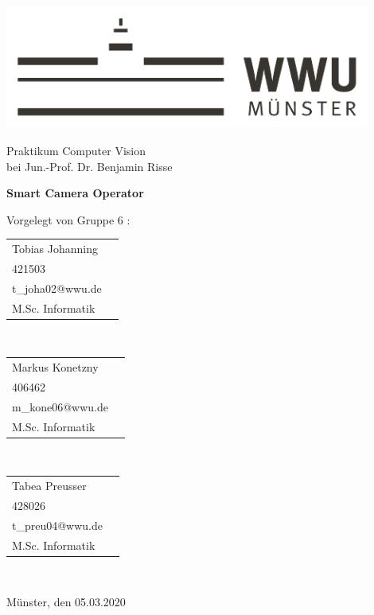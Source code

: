 
\begin{centering}
\vspace{4cm}
\includegraphics[width=12cm]{./img/wwu-logo-neu.pdf}

\vspace{2cm} 

{\large
	Praktikum Computer Vision\\[0.5cm]
	bei Jun.-Prof. Dr. Benjamin Risse\\[1cm]
}

{\LARGE
	\textbf{Smart Camera Operator}\\[2cm]
}


{\large
	Vorgelegt von Gruppe 6 :\\[0.5cm]
}



\begin{minipage}{\textwidth}
\begin{minipage}[c]{0.3\textwidth}
\centering
 \begin{tabular}{ll}
 		Tobias Johanning \\
    	{421503} \\
    	{t_joha02@wwu.de} \\
    	 M.Sc. Informatik\\
    \end{tabular}\\
\end{minipage}\hfill
\begin{minipage}[c]{0.3\textwidth}
\centering
   \begin{tabular}{ll}
 		Markus Konetzny \\
    	{406462} \\
    	{m_kone06@wwu.de} \\
    	M.Sc. Informatik\\
    \end{tabular}\\
\end{minipage}\hfill
\begin{minipage}[c]{0.3\textwidth}
\centering
   \begin{tabular}{ll}
 		Tabea Preusser \\
    	{428026} \\
    	{t_preu04@wwu.de} \\
    	M.Sc. Informatik\\
    \end{tabular}\\
\end{minipage}\hfill
\end{minipage}

\vspace{2 cm}
{\large
	Münster, den 05.03.2020\\[1cm]
}
\end{centering}

\vfill


 

